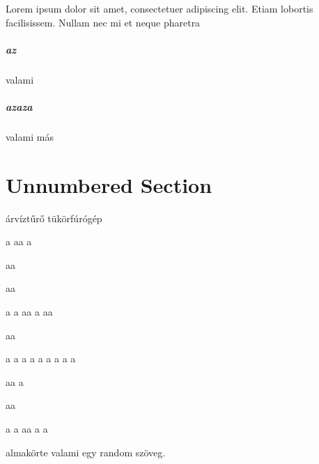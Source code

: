 \documentclass[12pt,oneside,justify]{book}
\begin{document}
Lorem ipsum dolor sit amet, consectetuer adipiscing elit.  
Etiam lobortis facilisissem.  Nullam nec mi et neque pharetra 
\paragraph{az}
valami 
\paragraph{azaza} 
valami más
 
\chapter{Unnumbered Section}
árvíztűrő tükörfúrógép

a
aa
a

aa

aa

a
a
aa
a
aa

aa

a
a
a
a
a
a
a
a
a

aa
a

aa

a
a
aa
a
a


almakörte valami egy random szöveg.
\printbibliography[heading=bibintoc,title={Irodalomjegyzék}]
\end{document}
